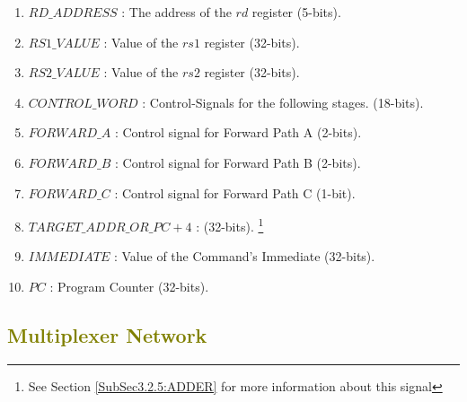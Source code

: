 {\begin{itemize}
\begin{enumerate}
 				\item \textcolor{forestgreen(web)}{$RD\_ADDRESS$} : The address of the $rd$ register (5-bits).
 				\item \textcolor{forestgreen(web)}{$RS1\_VALUE$} : Value of the $rs1$ register (32-bits).
 				\item \textcolor{forestgreen(web)}{$RS2\_VALUE$} : Value of the $rs2$ register (32-bits).
 				\item \textcolor{forestgreen(web)}{$CONTROL\_WORD$} : Control-Signals for the following stages. (18-bits).
 				\item \textcolor{forestgreen(web)}{$FORWARD\_A$} : Control signal for Forward Path A (2-bits).
 				\item \textcolor{forestgreen(web)}{$FORWARD\_B$} : Control signal for Forward Path B (2-bits).
 				\item \textcolor{forestgreen(web)}{$FORWARD\_C$} : Control signal for Forward Path C (1-bit).
 				\item \textcolor{forestgreen(web)}{$TARGET\_ADDR\_OR\_PC+4$} : (32-bits). \footnote{ See Section \ref{SubSec3.2.5:ADDER} for more information about this signal}
 				\item \textcolor{forestgreen(web)}{$IMMEDIATE$} : Value of the Command's Immediate (32-bits).
 				\item \textcolor{forestgreen(web)}{$PC$} : Program Counter (32-bits).
 				
 			\end{enumerate}
 	\end{itemize}}
 	\vspace{5mm}
 	
 	
 	\subsection{\textcolor{olive}{Multiplexer Network}}
 	\label{SubSec3.2.2:MUX NET}
 	
